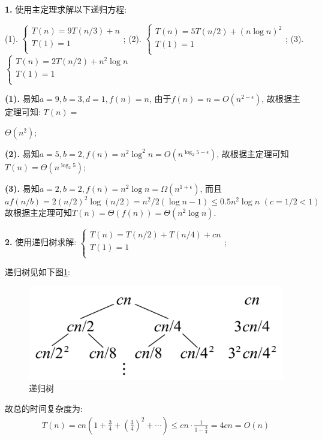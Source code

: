\documentclass{article}
\begin{document}
\pagebreak

\begin{homeworkProblem}
	\textbf{1.} 使用主定理求解以下递归方程:

	(1). $\begin{cases}
		T\left( n \right) =9T\left( n/3 \right) +n\\
		T\left( 1 \right) =1\\
	\end{cases}$;  (2). $\begin{cases}
		T\left( n \right) =5T\left( n/2 \right) +\left( n\log n \right) ^2\\
		T\left( 1 \right) =1\\
	\end{cases}$;  (3). $\begin{cases}
		T\left( n \right) =2T\left( n/2 \right) +n^2\log n\\
		T\left( 1 \right) =1\\
	\end{cases}$


	\solution
	

	\textbf{(1).} 易知$a=9,b=3,d=1,f(n)=n$, 由于$f\left( n \right) =n=O\left( n^{2-\epsilon} \right) $, 故根据主定理可知: 
	$T(n)=$
	
	$\Theta(n^2)$;

	\textbf{(2).} 易知$a=5,b=2,f(n)=n^2\log^2n=O(n^{\log_2 5-\epsilon})$, 故根据主定理可知$T(n)=\Theta \left( n^{\log_2 5} \right)$;

	\textbf{(3).} 易知$a=2,b=2,f(n)=n^2\log n=\Omega \left( n^{1+\epsilon} \right)$, 而且$$af\left( n/b \right) =2\left( n/2 \right) ^2\log \left( n/2 \right) =n^2/2\left( \log n-1 \right) \le 0.5n^2\log n\,\,\left( c=1/2<1 \right)$$
	故根据主定理可知$T(n)=\Theta(f(n))=\Theta(n^2\log n)$.

	\textbf{2.} 使用递归树求解: $\begin{cases}
		T\left( n \right) =T\left( n/2 \right) +T\left( n/4 \right) +cn\\
		T\left( 1 \right) =1\\
	\end{cases}$;
	
	\solution

	递归树见如下图\ref{fig:递归树-3}:
	\begin{figure}[H]  %
		\centering
		\includegraphics[width=0.4\linewidth]{images/title/递归树3.pdf}
		\caption{递归树}
		\label{fig:递归树-3}
	\end{figure}
	故总的时间复杂度为:
	\begin{align}
		T\left( n \right) =cn\left( 1+\frac{3}{4}+\left( \frac{3}{4} \right) ^2+\cdots \right) \le cn\cdot \frac{1}{1-\frac{3}{4}}=4cn=O\left( n \right) 
	\end{align}


\end{homeworkProblem}
\end{document}
